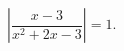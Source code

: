 \begin{ex}[type=equation]
	\begin{condition}
		$\left| \dfrac{x - 3}{x^2 + 2x - 3}\right| = 1.$
	\end{condition}
\end{ex}